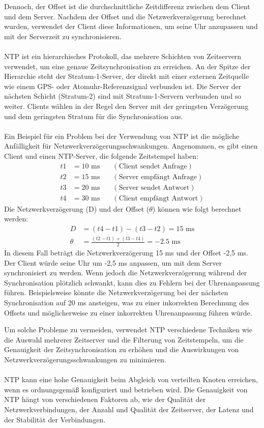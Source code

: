 Dennoch, der Offset ist die durchschnittliche Zeitdifferenz zwischen dem Client und dem Server. Nachdem der Offset und die Netzwerkverzögerung berechnet wurden, verwendet der Client diese Informationen, um seine Uhr anzupassen und mit der Serverzeit zu synchronisieren.
\\\\
NTP ist ein hierarchisches Protokoll, das mehrere Schichten von Zeitservern verwendet, um eine genaue Zeitsynchronisation zu erreichen. An der Spitze der Hierarchie steht der Stratum-1-Server, der direkt mit einer externen Zeitquelle wie einem GPS- oder Atomuhr-Referenzsignal verbunden ist. Die Server der nächsten Schicht (Stratum-2) sind mit Stratum-1-Servern verbunden und so weiter. Clients wählen in der Regel den Server mit der geringsten Verzögerung und dem geringsten Stratum für die Synchronisation aus.
\\\\
Ein Beispiel für ein Problem bei der Verwendung von NTP ist die mögliche Anfälligkeit für Netzwerkverzögerungsschwankungen. Angenommen, es gibt einen Client und einen NTP-Server, die folgende Zeitstempel haben:
\begin{align*}
t1 &= 10 \text{ ms} \quad &(\text{Client sendet Anfrage}) \\
t2 &= 15 \text{ ms} \quad &(\text{Server empfängt Anfrage}) \\
t3 &= 20 \text{ ms} \quad &(\text{Server sendet Antwort}) \\
t4 &= 30 \text{ ms} \quad &(\text{Client empfängt Antwort})
\end{align*}
Die Netzwerkverzögerung (D) und der Offset (\(\theta\)) können wie folgt berechnet werden:
\begin{align*}
D &= (t4 - t1) - (t3 - t2) = 15 \text{ ms} \\
\theta &= \frac{(t2 - t1) + (t3 - t4)}{2} = -2.5 \text{ ms}
\end{align*}
In diesem Fall beträgt die Netzwerkverzögerung 15 ms und der Offset -2,5 ms. Der Client würde seine Uhr um -2,5 ms anpassen, um mit dem Server synchronisiert zu werden. Wenn jedoch die Netzwerkverzögerung während der Synchronisation plötzlich schwankt, kann dies zu Fehlern bei der Uhrenanpassung führen. Beispielsweise könnte die Netzwerkverzögerung bei der nächsten Synchronisation auf 20 ms ansteigen, was zu einer inkorrekten Berechnung des Offsets und möglicherweise zu einer inkorrekten Uhrenanpassung führen würde.

Um solche Probleme zu vermeiden, verwendet NTP verschiedene Techniken wie die Auswahl mehrerer Zeitserver und die Filterung von Zeitstempeln, um die Genauigkeit der Zeitsynchronisation zu erhöhen und die Auswirkungen von Netzwerkverzögerungsschwankungen zu minimieren.
\\\\
NTP kann eine hohe Genauigkeit beim Abgleich von verteilten Knoten erreichen, wenn es ordnungsgemäß konfiguriert und betrieben wird. Die Genauigkeit von NTP hängt von verschiedenen Faktoren ab, wie der Qualität der Netzwerkverbindungen, der Anzahl und Qualität der Zeitserver, der Latenz und der Stabilität der Verbindungen.

